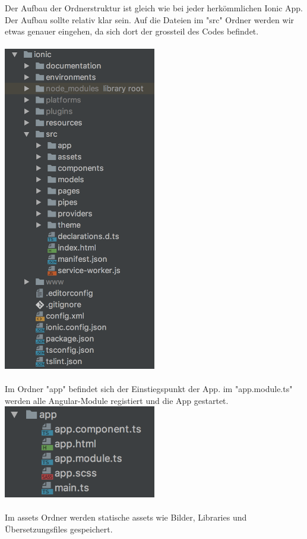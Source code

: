 \documentclass[11pt]{article} %
\begin{document}
Der Aufbau der Ordnerstruktur ist gleich wie bei jeder herkömmlichen Ionic App. Der Aufbau sollte relativ klar sein. Auf die Dateien im "src" Ordner werden wir etwas genauer eingehen, da sich dort der grossteil des Codes befindet.
\\
\\
\includegraphics[width=0.5\textwidth]{ionic/ionic-root} 
\\
\\
Im Ordner "app" befindet sich der Einstiegspunkt der App. im "app.module.ts" werden alle Angular-Module registiert und die App gestartet.
\\
\includegraphics[width=0.5\textwidth]{ionic/src-app}
\\
\\
Im assets Ordner werden statische assets wie Bilder, Libraries und Übersetzungsfiles gespeichert.  
\\
\end{document}
